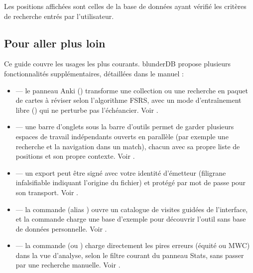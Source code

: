 \documentclass[letterpaper,10pt,french]{sphinxmanual}
\begin{document}
\sphinxAtStartPar
Les positions affichées sont celles de la base de données ayant vérifié
les critères de recherche entrés par l’utilisateur.


\subsection{Pour aller plus loin}
\label{\detokenize{guide_utilisateur:pour-aller-plus-loin}}
\sphinxAtStartPar
Ce guide couvre les usages les plus courants. blunderDB propose plusieurs
fonctionnalités supplémentaires, détaillées dans le manuel :
\begin{itemize}
\item {} 
\sphinxAtStartPar
{} — le panneau Anki () transforme une
collection ou une recherche en paquet de cartes à réviser selon
l’algorithme FSRS, avec un mode d’entraînement libre () qui ne
perturbe pas l’échéancier. Voir {\hyperref[\detokenize{manuel:panneau-anki}]{}}.

\item {} 
\sphinxAtStartPar
{} — une barre d’onglets sous la barre d’outils permet de
garder plusieurs espaces de travail indépendants ouverts en parallèle (par
exemple une recherche et la navigation dans un match), chacun avec sa
propre liste de positions et son propre contexte. Voir {\hyperref[\detokenize{manuel:onglets-vues}]{}}.

\item {} 
\sphinxAtStartPar
{} — un export peut être signé avec votre identité
d’émetteur (filigrane infalsifiable indiquant l’origine du fichier) et
protégé par mot de passe pour son transport. Voir {\hyperref[\detokenize{manuel:diffusion-controlee}]{}}.

\item {} 
\sphinxAtStartPar
{} — la commande 
(alias ) ouvre un catalogue de visites guidées de l’interface,
et la commande  charge une base d’exemple pour découvrir l’outil
sans base de données personnelle. Voir {\hyperref[\detokenize{manuel:visites-guidees}]{}}.

\item {} 
\sphinxAtStartPar
{} — la commande  (ou )
charge directement les pires erreurs (équité ou MWC) dans la vue
d’analyse, selon le filtre courant du panneau Stats, sans passer par une
recherche manuelle. Voir {\hyperref[\detokenize{manuel:stats}]{}}.

\end{itemize}
\end{document}
